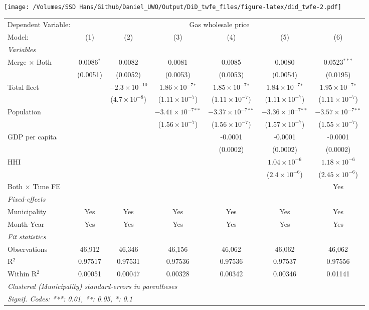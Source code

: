 \documentclass[
]{article}
\begin{document}
\texttt{[image: /Volumes/SSD Hans/Github/Daniel\_UWO/Output/DiD\_twfe\_files/figure-latex/did\_twfe-2.pdf]}

\begin{tabular}{lcccccc}
\tabularnewline\midrule\midrule
Dependent Variable:&\multicolumn{6}{c}{Gas wholesale price}\\
Model:&(1) & (2) & (3) & (4) & (5) & (6)\\
\midrule \emph{Variables}&   &   &   &   &   &  \\
Merge $\times $ Both & 0.0086$^{*}$ & 0.0082 & 0.0081 & 0.0085 & 0.0080 & 0.0523$^{***}$\\
  &(0.0051) & (0.0052) & (0.0053) & (0.0053) & (0.0054) & (0.0195)\\
Total fleet &    & $-2.3\times 10^{-10}$ & $1.86\times 10^{-7}$$^{*}$ & $1.85\times 10^{-7}$$^{*}$ & $1.84\times 10^{-7}$$^{*}$ & $1.95\times 10^{-7}$$^{*}$\\
  &   & ($4.7\times 10^{-8}$) & ($1.11\times 10^{-7}$) & ($1.11\times 10^{-7}$) & ($1.11\times 10^{-7}$) & ($1.11\times 10^{-7}$)\\
Population &    &    & $-3.41\times 10^{-7}$$^{**}$ & $-3.37\times 10^{-7}$$^{**}$ & $-3.36\times 10^{-7}$$^{**}$ & $-3.57\times 10^{-7}$$^{**}$\\
  &   &    & ($1.56\times 10^{-7}$) & ($1.56\times 10^{-7}$) & ($1.57\times 10^{-7}$) & ($1.55\times 10^{-7}$)\\
GDP per capita &    &    &    & -0.0001 & -0.0001 & -0.0001\\
  &   &    &    & (0.0002) & (0.0002) & (0.0002)\\
HHI &    &    &    &    & $1.04\times 10^{-6}$ & $1.18\times 10^{-6}$\\
  &   &    &    &    & ($2.4\times 10^{-6}$) & ($2.45\times 10^{-6}$)\\
Both $\times$ Time FE &  &  &  &  &  & Yes\\
\midrule \emph{Fixed-effects}&   &   &   &   &   &  \\
Municipality & Yes & Yes & Yes & Yes & Yes & Yes\\
Month-Year & Yes & Yes & Yes & Yes & Yes & Yes\\
\midrule \emph{Fit statistics}&  & & & & & \\
Observations & 46,912&46,346&46,156&46,062&46,062&46,062\\
R$^2$ & 0.97517&0.97531&0.97536&0.97536&0.97537&0.97556\\
Within R$^2$ & 0.00051&0.00047&0.00328&0.00342&0.00346&0.01141\\
\midrule\midrule\multicolumn{7}{l}{\emph{Clustered (Municipality) standard-errors in parentheses}}\\
\multicolumn{7}{l}{\emph{Signif. Codes: ***: 0.01, **: 0.05, *: 0.1}}\\
\end{tabular}
\end{document}

